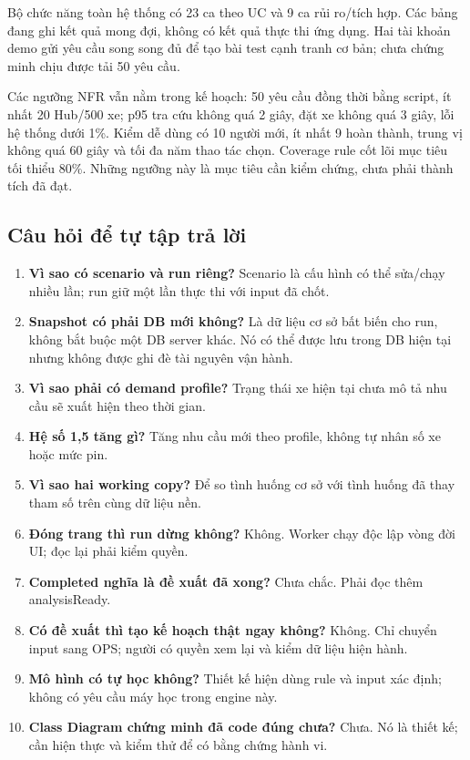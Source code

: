 \documentclass[12pt,a4paper]{article}
\begin{document}
Bộ chức năng toàn hệ thống có 23 ca theo UC và 9 ca rủi ro/tích hợp. Các bảng đang ghi kết quả mong đợi, không có kết quả thực thi ứng dụng. Hai tài khoản demo gửi yêu cầu song song đủ để tạo bài test cạnh tranh cơ bản; chưa chứng minh chịu được tải 50 yêu cầu.

Các ngưỡng NFR vẫn nằm trong kế hoạch: 50 yêu cầu đồng thời bằng script, ít nhất 20 Hub/500 xe; p95 tra cứu không quá 2 giây, đặt xe không quá 3 giây, lỗi hệ thống dưới 1\%. Kiểm dễ dùng có 10 người mới, ít nhất 9 hoàn thành, trung vị không quá 60 giây và tối đa năm thao tác chọn. Coverage rule cốt lõi mục tiêu tối thiểu 80\%. Những ngưỡng này là mục tiêu cần kiểm chứng, chưa phải thành tích đã đạt.

\subsection{Câu hỏi để tự tập trả lời}
\begin{enumerate}
\item \textbf{Vì sao có scenario và run riêng?} Scenario là cấu hình có thể sửa/chạy nhiều lần; run giữ một lần thực thi với input đã chốt.
\item \textbf{Snapshot có phải DB mới không?} Là dữ liệu cơ sở bất biến cho run, không bắt buộc một DB server khác. Nó có thể được lưu trong DB hiện tại nhưng không được ghi đè tài nguyên vận hành.
\item \textbf{Vì sao phải có demand profile?} Trạng thái xe hiện tại chưa mô tả nhu cầu sẽ xuất hiện theo thời gian.
\item \textbf{Hệ số 1,5 tăng gì?} Tăng nhu cầu mới theo profile, không tự nhân số xe hoặc mức pin.
\item \textbf{Vì sao hai working copy?} Để so tình huống cơ sở với tình huống đã thay tham số trên cùng dữ liệu nền.
\item \textbf{Đóng trang thì run dừng không?} Không. Worker chạy độc lập vòng đời UI; đọc lại phải kiểm quyền.
\item \textbf{Completed nghĩa là đề xuất đã xong?} Chưa chắc. Phải đọc thêm analysisReady.
\item \textbf{Có đề xuất thì tạo kế hoạch thật ngay không?} Không. Chỉ chuyển input sang OPS; người có quyền xem lại và kiểm dữ liệu hiện hành.
\item \textbf{Mô hình có tự học không?} Thiết kế hiện dùng rule và input xác định; không có yêu cầu máy học trong engine này.
\item \textbf{Class Diagram chứng minh đã code đúng chưa?} Chưa. Nó là thiết kế; cần hiện thực và kiểm thử để có bằng chứng hành vi.
\end{enumerate}
\end{document}
